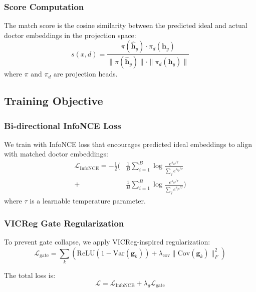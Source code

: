 \documentclass[journal]{IEEEtran}
\begin{document}
\subsubsection{Score Computation}

The match score is the cosine similarity between the predicted
ideal and actual doctor embeddings in the projection space:
\begin{equation}
s(x, d) = \frac{\pi(\hat{\mathbf{h}}_y) \cdot \pi_d(\mathbf{h}_y)}
{\|\pi(\hat{\mathbf{h}}_y)\| \cdot \|\pi_d(\mathbf{h}_y)\|}
\end{equation}
where $\pi$ and $\pi_d$ are projection heads.

\subsection{Training Objective}

\subsubsection{Bi-directional InfoNCE Loss}

We train with InfoNCE loss that encourages predicted ideal
embeddings to align with matched doctor embeddings:
\begin{equation}
\begin{split}
\mathcal{L}_{\text{InfoNCE}} = -\frac{1}{2}\Bigg(
& \frac{1}{B}\sum_{i=1}^{B} \log\frac{e^{s_{ii}/\tau}}{\sum_j e^{s_{ij}/\tau}} \\
+ & \frac{1}{B}\sum_{i=1}^{B} \log\frac{e^{s_{ii}/\tau}}{\sum_j e^{s_{ji}/\tau}}
\Bigg)
\end{split}
\end{equation}
where $\tau$ is a learnable temperature parameter.

\subsubsection{VICReg Gate Regularization}

To prevent gate collapse, we apply VICReg-inspired regularization:
\begin{equation}
\mathcal{L}_{\text{gate}} = \sum_k \left(\mathrm{ReLU}(1 - \mathrm{Var}(\mathbf{g}_k)) +
\lambda_{\text{cov}} \|\mathrm{Cov}(\mathbf{g}_k)\|_F^2\right)
\end{equation}

The total loss is:
\begin{equation}
\mathcal{L} = \mathcal{L}_{\text{InfoNCE}} + \lambda_g \mathcal{L}_{\text{gate}}
\end{equation}
\end{document}
